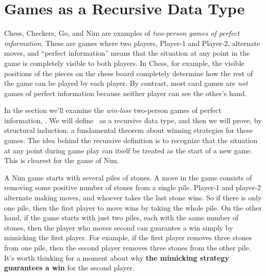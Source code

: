 \begin{definition}
\begin{problems}
\homeworkproblems
{}

\end{problems}

\newcommand{\nimg}[1]{\text{Nim}_{\ang{#1}}}

\section{Games as a Recursive Data Type}\label{recursive_games}
Chess, Checkers, Go, and Nim are examples of \emph{two-person games of
  perfect information}.  These are games where two players, Player-1
and Player-2, alternate moves, and ``perfect information'' means that
the situation at any point in the game is completely visible to both
players.  In Chess, for example, the visible positions of the pieces
on the chess board completely determine how the rest of the game can
be played by each player.  By contrast, most card games are \emph{not}
games of perfect information because neither player can see the
other's hand.

In the section we'll examine the \emph{win-lose} two-person games of
perfect information, \wnls.  We will define \wnls\ as a recursive data
type, and then we will prove, by structural induction, a fundamental
theorem about winning strategies for these games.  The idea behind the
recursive definition is to recognize that the situation at any point
during game play can itself be treated as the start of a new game.
This is clearest for the game of Nim.

A Nim game starts with several piles of stones.  A move in the game
consists of removing some positive number of stones from a single
pile.  Player-1 and player-2 alternate making moves, and whoever takes
the last stone wins.  So if there is only one pile, then the first
player to move wins by taking the whole pile.  On the other hand, if
the game starts with just two piles, each with the same number of
stones, then the player who moves second can guarantee a win simply by
mimicking the first player.  For example, if the first player removes
three stones from one pile, then the second player removes three
stones from the other pile.  It's worth thinking for a moment about
why \textbf{the mimicking strategy guarantees a win} for the second
player.


\end{definition}
